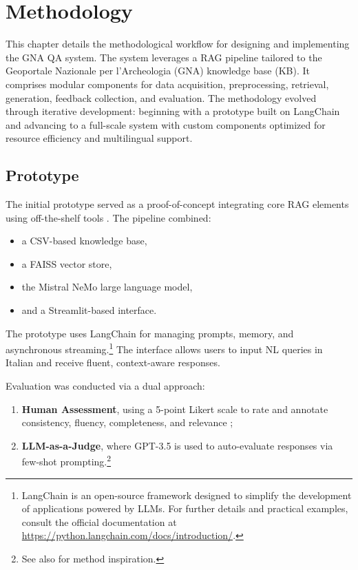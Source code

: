 \chapter{Methodology}
\label{chap:methodology}
\begin{spacing}{1.5}

This chapter details the methodological workflow for designing and implementing the GNA QA system. The system leverages a RAG pipeline tailored to the Geoportale Nazionale per l’Archeologia (GNA) knowledge base (KB). It comprises modular components for data acquisition, preprocessing, retrieval, generation, feedback collection, and evaluation. The methodology evolved through iterative development: beginning with a prototype built on LangChain and advancing to a full-scale system with custom components optimized for resource efficiency and multilingual support.


\section{Prototype}
The initial prototype served as a proof-of-concept integrating core RAG elements using off-the-shelf tools \citep{mishra_using_2024,akkiraju_facts_2024}. The pipeline combined:
\begin{itemize}
      \item a CSV-based knowledge base,
      \item a FAISS vector store,
      \item the Mistral NeMo large language model,
      \item and a Streamlit-based interface.
\end{itemize}

The prototype uses LangChain for managing prompts, memory, and asynchronous streaming.\footnote{LangChain is an open-source framework designed to simplify the development of applications powered by LLMs. For further details and practical examples, consult the official documentation at \url{https://python.langchain.com/docs/introduction/}.} The interface allows users to input NL queries in Italian and receive fluent, context-aware responses.\nocite{noauthor_langchain_2024}

Evaluation was conducted via a dual approach:
\begin{enumerate}
      \item \textbf{Human Assessment}, using a 5-point Likert scale to rate and annotate consistency, fluency, completeness, and relevance \citep{abeysinghe_challenges_2024};
      \item \textbf{LLM-as-a-Judge}, where GPT-3.5 is used to auto-evaluate responses via few-shot prompting.\footnote{See also \citep{svikhnushina_approximating_2023} for method inspiration.}
\end{enumerate}


\end{spacing}
